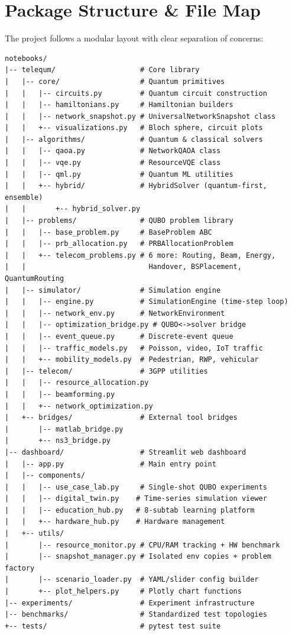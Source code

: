 \documentclass[11pt,a4paper]{article}
\begin{document}
\section{Package Structure \& File Map}

The project follows a modular layout with clear separation of concerns:

\begin{lstlisting}[language={},title={\textbf{Project Root}: \texttt{notebooks/}}]
notebooks/
|-- telequm/                    # Core library
|   |-- core/                   # Quantum primitives
|   |   |-- circuits.py         # Quantum circuit construction
|   |   |-- hamiltonians.py     # Hamiltonian builders
|   |   |-- network_snapshot.py # UniversalNetworkSnapshot class
|   |   +-- visualizations.py   # Bloch sphere, circuit plots
|   |-- algorithms/             # Quantum & classical solvers
|   |   |-- qaoa.py             # NetworkQAOA class
|   |   |-- vqe.py              # ResourceVQE class
|   |   |-- qml.py              # Quantum ML utilities
|   |   +-- hybrid/             # HybridSolver (quantum-first, ensemble)
|   |       +-- hybrid_solver.py
|   |-- problems/               # QUBO problem library
|   |   |-- base_problem.py     # BaseProblem ABC
|   |   |-- prb_allocation.py   # PRBAllocationProblem
|   |   +-- telecom_problems.py # 6 more: Routing, Beam, Energy,
|   |                             Handover, BSPlacement, QuantumRouting
|   |-- simulator/              # Simulation engine
|   |   |-- engine.py           # SimulationEngine (time-step loop)
|   |   |-- network_env.py      # NetworkEnvironment
|   |   |-- optimization_bridge.py # QUBO<->solver bridge
|   |   |-- event_queue.py      # Discrete-event queue
|   |   |-- traffic_models.py   # Poisson, video, IoT traffic
|   |   +-- mobility_models.py  # Pedestrian, RWP, vehicular
|   |-- telecom/                # 3GPP utilities
|   |   |-- resource_allocation.py
|   |   |-- beamforming.py
|   |   +-- network_optimization.py
|   +-- bridges/                # External tool bridges
|       |-- matlab_bridge.py
|       +-- ns3_bridge.py
|-- dashboard/                  # Streamlit web dashboard
|   |-- app.py                  # Main entry point
|   |-- components/
|   |   |-- use_case_lab.py     # Single-shot QUBO experiments
|   |   |-- digital_twin.py    # Time-series simulation viewer
|   |   |-- education_hub.py   # 8-subtab learning platform
|   |   +-- hardware_hub.py    # Hardware management
|   +-- utils/
|       |-- resource_monitor.py # CPU/RAM tracking + HW benchmark
|       |-- snapshot_manager.py # Isolated env copies + problem factory
|       |-- scenario_loader.py  # YAML/slider config builder
|       +-- plot_helpers.py     # Plotly chart functions
|-- experiments/                # Experiment infrastructure
|-- benchmarks/                 # Standardized test topologies
+-- tests/                      # pytest test suite
\end{lstlisting}
\end{document}
